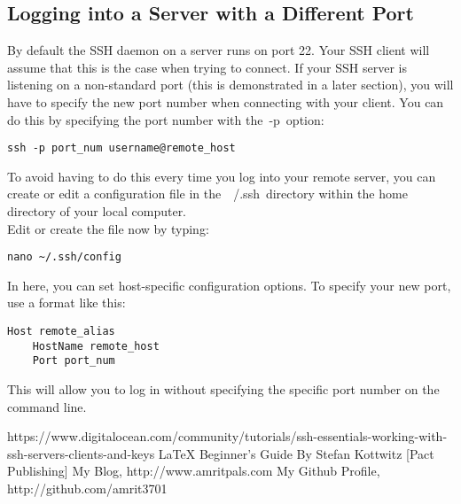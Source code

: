 \documentclass[12pt]{report}
\begin{document}
\subsection{Logging into a Server with a Different Port}
By default the SSH daemon on a server runs on port 22. Your SSH client will assume that this is the case when trying to connect. If your SSH server is listening on a non-standard port (this is demonstrated in a later section), you will have to specify the new port number when connecting with your client.
You can do this by specifying the port number with the -p option:
\begin{lstlisting} 
ssh -p port_num username@remote_host
\end{lstlisting} 
To avoid having to do this every time you log into your remote server, you can create or edit a configuration file in the ~/.ssh directory within the home directory of your local computer.\\
Edit or create the file now by typing:
\begin{lstlisting} 
nano ~/.ssh/config
\end{lstlisting} 
In here, you can set host-specific configuration options. To specify your new port, use a format like this:
\begin{lstlisting} 
Host remote_alias
    HostName remote_host
    Port port_num
\end{lstlisting} 
This will allow you to log in without specifying the specific port number on the command line.

\begin{thebibliography}{9}
\bibitem{} https://www.digitalocean.com/community/tutorials/ssh-essentials-working-with-ssh-servers-clients-and-keys
\bibitem{} \LaTeX{} Beginner's Guide By Stefan Kottwitz [Pact Publishing]
\bibitem{} My Blog, http://www.amritpals.com
\bibitem{} My Github Profile, http://github.com/amrit3701
\end{thebibliography}
%
\end{document}

